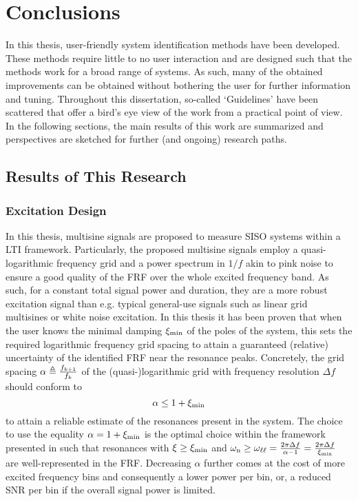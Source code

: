 \chapter{Conclusions}
\glsresetall

In this thesis, user-friendly system identification methods have been developed.
These methods require little to no user interaction and are designed such that the methods work for a broad range of systems.
As such, many of the obtained improvements can be obtained without bothering the user for further information and tuning.
Throughout this dissertation, so-called `Guidelines' have been scattered that offer a bird's eye view of the work from a practical point of view.
In the following sections, the main results of this work are summarized and perspectives are sketched for further (and ongoing) research paths.

\section{Results of This Research}

  \subsection{Excitation Design}
  In this thesis, multisine signals are proposed to measure \gls{SISO} systems within a \gls{LTI} framework.
  Particularly, the proposed multisine signals employ a quasi-logarithmic frequency grid and a power spectrum in $1/f$ akin to pink noise to ensure a good quality of the \gls{FRF} over the whole excited frequency band.
  As such, for a constant total signal power and duration, they are a more robust excitation signal than e.g. typical general-use signals such as linear grid multisines or white noise excitation.
  In this thesis it has been proven that when the user knows the minimal damping $\damping[\min]$ of the poles of the system, this sets the required logarithmic frequency grid spacing to attain a guaranteed (relative) uncertainty of the identified \gls{FRF} near the resonance peaks.
  Concretely, the grid spacing $\alpha \isdef \frac{f_{k+1}}{f_k}$ of the (quasi-)logarithmic grid with frequency resolution $\Delta f$ should conform to
  \begin{equation}
    \alpha \leq 1 + \damping[\min]
  \end{equation}
  to attain a reliable estimate of the resonances present in the system.
  The choice to use the equality $\alpha = 1+ \damping[\min]$ is the optimal choice within the framework presented in  such that resonances with $\damping \geq \damping[\min]$ and $\wn \geq \omegaLinLog = \frac{2 \pi \Delta f}{\alpha-1} = \frac{2 \pi \Delta f}{\damping[\min]}$ are well-represented in the \gls{FRF}.
  Decreasing $ \alpha$ further comes at the cost of more excited frequency bins and consequently a lower power per bin, or, a reduced \gls{SNR} per bin if the overall signal power is limited.

